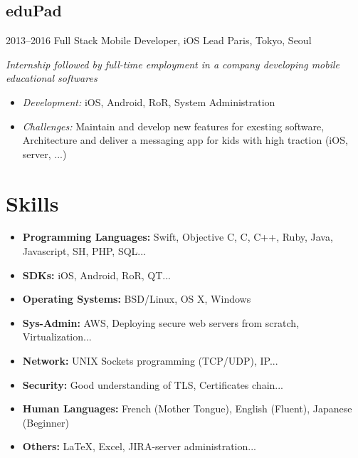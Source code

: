 \documentclass[]{template/friggeri-cv} %
\begin{document}
\subsection{eduPad}
\begin{entrylist}


\entry
{2013--2016}
{Full Stack Mobile Developer, iOS Lead}
{Paris, Tokyo, Seoul}
{\emph{Internship followed by full-time employment in a company developing mobile educational softwares}
\begin{itemize}
\item{\emph{Development:} iOS, Android, RoR, System Administration}
\item{\emph{Challenges:} Maintain and develop new features for exesting software, Architecture and deliver a messaging app for kids with high traction (iOS, server, ...)}

\end{itemize}
}

\end{entrylist}





\section{Skills}

\begin{itemize}
\item \textbf{Programming Languages:} Swift, Objective C, C, C++, Ruby, Java, Javascript, SH, PHP, SQL...
\item \textbf{SDKs:} iOS, Android, RoR, QT...
\item \textbf{Operating Systems:} BSD/Linux, OS X, Windows
\item \textbf{Sys-Admin:} AWS, Deploying secure web servers from scratch, Virtualization...
\item \textbf{Network:} UNIX Sockets programming (TCP/UDP), IP...
\item \textbf{Security:} Good understanding of TLS, Certificates chain...
\item \textbf{Human Languages:} French (Mother Tongue), English (Fluent), Japanese (Beginner)
\item \textbf{Others:} \LaTeX, Excel, JIRA-server administration...
\end{itemize}
\end{document}
